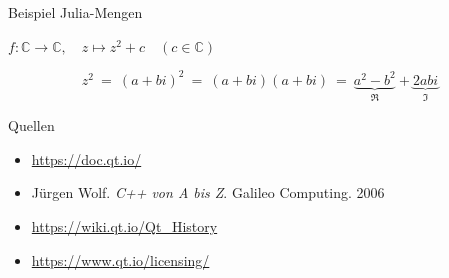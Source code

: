 \documentclass[aspectratio=169]{beamer}
\begin{document}
\begin{frame}{Beispiel Julia-Mengen}
\begin{center}
{\Large \(f : \mathbb{C} \rightarrow \mathbb{C}, \quad z \mapsto z^2+c \quad (c \in \mathbb{C})\)}
\end{center}

\[ z^2 ~=~ (a+bi)^2 ~=~ (a+bi)(a+bi) ~=~ \underbrace{a^2 - b^2}_\Re + \underbrace{2abi}_\Im \]
\end{frame}


\begin{frame}{Quellen}
\begin{itemize}
\item \url{https://doc.qt.io/}
\item Jürgen Wolf. \textit{C++ von A bis Z}. Galileo Computing. 2006
\item \url{https://wiki.qt.io/Qt_History}
\item \url{https://www.qt.io/licensing/}
\end{itemize}
\end{frame}

\end{document}
